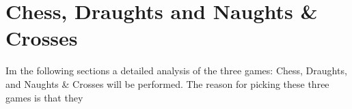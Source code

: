 \section{Chess, Draughts and Naughts \& Crosses}

Im the following sections a detailed analysis of the three games: Chess, Draughts, and Naughts \& Crosses will be performed. The reason for picking these three games is that they   
